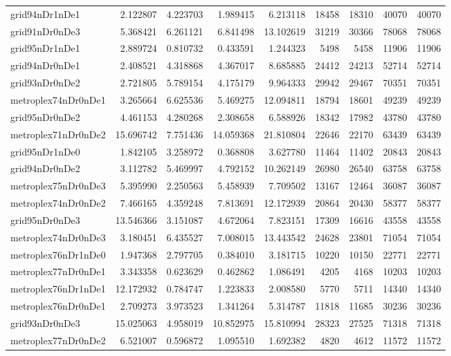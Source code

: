 \begin{longtable}{|l|r|r|r|r|r|r|r|r|}
grid94nDr1nDe1 & 2.122807 & 4.223703 & 1.989415 & 6.213118 & 18458 & 18310 & 40070 & 40070 \\
grid91nDr0nDe3 & 5.368421 & 6.261121 & 6.841498 & 13.102619 & 31219 & 30366 & 78068 & 78068 \\
grid95nDr1nDe1 & 2.889724 & 0.810732 & 0.433591 & 1.244323 & 5498 & 5458 & 11906 & 11906 \\
grid94nDr0nDe1 & 2.408521 & 4.318868 & 4.367017 & 8.685885 & 24412 & 24213 & 52714 & 52714 \\
grid93nDr0nDe2 & 2.721805 & 5.789154 & 4.175179 & 9.964333 & 29942 & 29467 & 70351 & 70351 \\
metroplex74nDr0nDe1 & 3.265664 & 6.625536 & 5.469275 & 12.094811 & 18794 & 18601 & 49239 & 49239 \\
grid95nDr0nDe2 & 4.461153 & 4.280268 & 2.308658 & 6.588926 & 18342 & 17982 & 43780 & 43780 \\
metroplex71nDr0nDe2 & 15.696742 & 7.751436 & 14.059368 & 21.810804 & 22646 & 22170 & 63439 & 63439 \\
grid95nDr1nDe0 & 1.842105 & 3.258972 & 0.368808 & 3.627780 & 11464 & 11402 & 20843 & 20843 \\
grid94nDr0nDe2 & 3.112782 & 5.469997 & 4.792152 & 10.262149 & 26980 & 26540 & 63758 & 63758 \\
metroplex75nDr0nDe3 & 5.395990 & 2.250563 & 5.458939 & 7.709502 & 13167 & 12464 & 36087 & 36087 \\
metroplex74nDr0nDe2 & 7.466165 & 4.359248 & 7.813691 & 12.172939 & 20864 & 20430 & 58377 & 58377 \\
grid95nDr0nDe3 & 13.546366 & 3.151087 & 4.672064 & 7.823151 & 17309 & 16616 & 43558 & 43558 \\
metroplex74nDr0nDe3 & 3.180451 & 6.435527 & 7.008015 & 13.443542 & 24628 & 23801 & 71054 & 71054 \\
metroplex76nDr1nDe0 & 1.947368 & 2.797705 & 0.384010 & 3.181715 & 10220 & 10150 & 22771 & 22771 \\
metroplex77nDr0nDe1 & 3.343358 & 0.623629 & 0.462862 & 1.086491 & 4205 & 4168 & 10203 & 10203 \\
metroplex76nDr1nDe1 & 12.172932 & 0.784747 & 1.223833 & 2.008580 & 5770 & 5711 & 14340 & 14340 \\
metroplex76nDr0nDe1 & 2.709273 & 3.973523 & 1.341264 & 5.314787 & 11818 & 11685 & 30236 & 30236 \\
grid93nDr0nDe3 & 15.025063 & 4.958019 & 10.852975 & 15.810994 & 28323 & 27525 & 71318 & 71318 \\
metroplex77nDr0nDe2 & 6.521007 & 0.596872 & 1.095510 & 1.692382 & 4820 & 4612 & 11572 & 11572 \\

\end{longtable}
